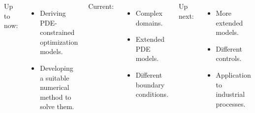 \documentclass[aspectratio=169,xcolor=dvipsnames]{beamer}
\begin{document}
\begin{frame}
\begin{columns}
		
	Up to now:
	\begin{itemize}
		\item Deriving PDE-constrained optimization models.
		\item Developing a suitable numerical method to solve them.
	\end{itemize}
	Current:
	\begin{itemize}
		\item Complex domains.
		\item Extended PDE models.
		\item Different boundary conditions.
	\end{itemize}
	Up next:
	\begin{itemize}
		\item More extended models.
		\item Different controls.
		\item Application to industrial processes.
	\end{itemize}
	\vspace{-0.6cm}
	\begin{figure}
		\includegraphics[width=2.7cm]{west.png}\\
		\includegraphics[width=3cm]{beer.png}\\
		\includegraphics[width=3cm]{ufraction8.png}\\
		\includegraphics[width=3cm]{Microfilter.png}
	\end{figure}
	\end{columns}
\end{frame}
\end{document}
